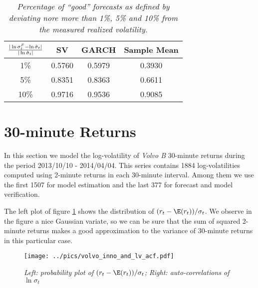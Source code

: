\begin{table}[htb!]
  \centering
  \begin{tabular}{|c|c|c|c|}
    \hline
    ${|\ln \sigma^F_t - \ln \hat{\sigma}_t| \over |\ln
      \hat{\sigma}_t|}$ &
    SV & GARCH & Sample Mean \\
    \hline
    1\% & 0.5760 & 0.5979 & 0.3930 \\
    \hline
    5\% & 0.8351 & 0.8363 & 0.6611 \\
    \hline
    10\% & 0.9716 & 0.9536 & 0.9085 \\
    \hline
  \end{tabular}
  \caption{\small \it Percentage of ``good'' forecasts as defined by
    deviating nore more than 1\%, 5\% and 10\% from the measured
    realized volatility.}
  \label{tab:volvo_15_diff}
\end{table}


\section{30-minute Returns}\label{sec:volvo_30}
In this section we model the log-volatility of {\it Volvo B} 30-minute
returns during the period 2013/10/10 - 2014/04/04. This series
contains 1884 log-volatilities computed using 2-minute returns in each
30-minute interval. Among them we use the first 1507 for model
estimation and the last 377 for forecast and model verification.

The left plot of figure \ref{fig:volvo_inno_and_lv_acf} shows the
distribution of $(r_t - \E(r_t))/\sigma_t$. We observe in the figure a
nice Gaussian variate, so we can be sure that the sum of squared
2-minute returns makes a good approximation to the variance of
30-minute returns in this particular case.
\begin{figure}[htb!]
  \centering
    \texttt{[image: ../pics/volvo\_inno\_and\_lv\_acf.pdf]}
    \label{fig:volvo_inno_and_lv_acf}
  \caption{\small \it Left: probability plot of $(r_t -
    \E(r_t))/\sigma_t$; Right: auto-correlations of $\ln \sigma_t$}
\end{figure}

